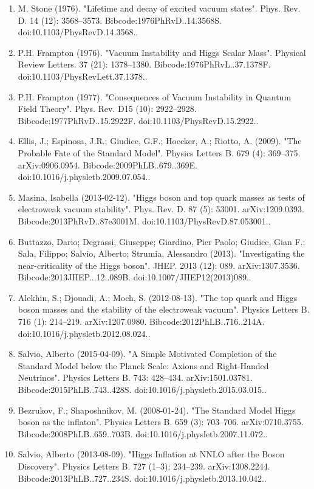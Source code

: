 \begin{enumerate}
    \item M. Stone (1976). "Lifetime and decay of excited vacuum states". Phys. Rev. D. 14 (12): 3568–3573. Bibcode:1976PhRvD..14.3568S. doi:10.1103/PhysRevD.14.3568..
    \item P.H. Frampton (1976). "Vacuum Instability and Higgs Scalar Mass". Physical Review Letters. 37 (21): 1378–1380. Bibcode:1976PhRvL..37.1378F. doi:10.1103/PhysRevLett.37.1378..
    \item P.H. Frampton (1977). "Consequences of Vacuum Instability in Quantum Field Theory". Phys. Rev. D15 (10): 2922–2928. Bibcode:1977PhRvD..15.2922F. doi:10.1103/PhysRevD.15.2922..
    \item Ellis, J.; Espinosa, J.R.; Giudice, G.F.; Hoecker, A.; Riotto, A. (2009). "The Probable Fate of the Standard Model". Physics Letters B. 679 (4): 369–375. arXiv:0906.0954. Bibcode:2009PhLB..679..369E. doi:10.1016/j.physletb.2009.07.054..
    \item Masina, Isabella (2013-02-12). "Higgs boson and top quark masses as tests of electroweak vacuum stability". Phys. Rev. D. 87 (5): 53001. arXiv:1209.0393. Bibcode:2013PhRvD..87e3001M. doi:10.1103/PhysRevD.87.053001..
    \item Buttazzo, Dario; Degrassi, Giuseppe; Giardino, Pier Paolo; Giudice, Gian F.; Sala, Filippo; Salvio, Alberto; Strumia, Alessandro (2013). "Investigating the near-criticality of the Higgs boson". JHEP. 2013 (12): 089. arXiv:1307.3536. Bibcode:2013JHEP...12..089B. doi:10.1007/JHEP12(2013)089..
    \item Alekhin, S.; Djouadi, A.; Moch, S. (2012-08-13). "The top quark and Higgs boson masses and the stability of the electroweak vacuum". Physics Letters B. 716 (1): 214–219. arXiv:1207.0980. Bibcode:2012PhLB..716..214A. doi:10.1016/j.physletb.2012.08.024..
    \item Salvio, Alberto (2015-04-09). "A Simple Motivated Completion of the Standard Model below the Planck Scale: Axions and Right-Handed Neutrinos". Physics Letters B. 743: 428–434. arXiv:1501.03781. Bibcode:2015PhLB..743..428S. doi:10.1016/j.physletb.2015.03.015..
    \item Bezrukov, F.; Shaposhnikov, M. (2008-01-24). "The Standard Model Higgs boson as the inflaton". Physics Letters B. 659 (3): 703–706. arXiv:0710.3755. Bibcode:2008PhLB..659..703B. doi:10.1016/j.physletb.2007.11.072..
    \item Salvio, Alberto (2013-08-09). "Higgs Inflation at NNLO after the Boson Discovery". Physics Letters B. 727 (1–3): 234–239. arXiv:1308.2244. Bibcode:2013PhLB..727..234S. doi:10.1016/j.physletb.2013.10.042..

\end{enumerate}
